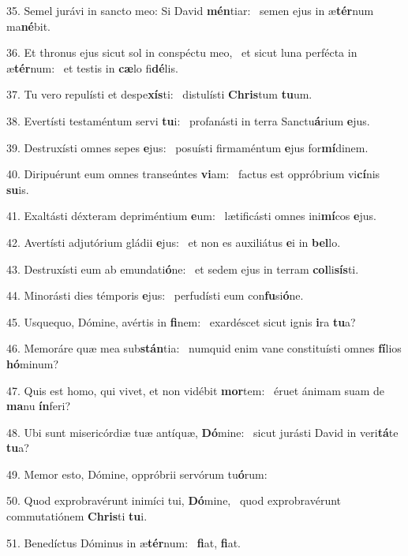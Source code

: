35. Semel jurávi in sancto meo: Si David \textbf{mén}tiar: \ast\  semen ejus in æ\textbf{tér}num ma\textbf{né}bit.\

36. Et thronus ejus sicut sol in conspéctu meo, \dag\  et sicut luna perfécta in æ\textbf{tér}num: \ast\  et testis in \textbf{cæ}lo fi\textbf{dé}lis.\

37. Tu vero repulísti et despe\textbf{xís}ti: \ast\  distulísti \textbf{Chris}tum \textbf{tu}um.\

38. Evertísti testaméntum servi \textbf{tu}i: \ast\  profanásti in terra Sanctu\textbf{á}rium \textbf{e}jus.\

39. Destruxísti omnes sepes \textbf{e}jus: \ast\  posuísti firmaméntum \textbf{e}jus for\textbf{mí}dinem.\

40. Diripuérunt eum omnes transeúntes \textbf{vi}am: \ast\  factus est oppróbrium vi\textbf{cí}nis \textbf{su}is.\

41. Exaltásti déxteram depriméntium \textbf{e}um: \ast\  lætificásti omnes ini\textbf{mí}cos \textbf{e}jus.\

42. Avertísti adjutórium gládii \textbf{e}jus: \ast\  et non es auxiliátus \textbf{e}i in \textbf{bel}lo.\

43. Destruxísti eum ab emundati\textbf{ó}ne: \ast\  et sedem ejus in terram \textbf{col}li\textbf{sís}ti.\

44. Minorásti dies témporis \textbf{e}jus: \ast\  perfudísti eum con\textbf{fu}si\textbf{ó}ne.\

45. Usquequo, Dómine, avértis in \textbf{fi}nem: \ast\  exardéscet sicut ignis \textbf{i}ra \textbf{tu}a?\

46. Memoráre quæ mea sub\textbf{stán}tia: \ast\  numquid enim vane constituísti omnes \textbf{fí}lios \textbf{hó}minum?\

47. Quis est homo, qui vivet, et non vidébit \textbf{mor}tem: \ast\  éruet ánimam suam de \textbf{ma}nu \textbf{ín}feri?\

48. Ubi sunt misericórdiæ tuæ antíquæ, \textbf{Dó}mine: \ast\  sicut jurásti David in veri\textbf{tá}te \textbf{tu}a?\

49. Memor esto, Dómine, oppróbrii servórum tu\textbf{ó}rum: \ast\  \

50. Quod exprobravérunt inimíci tui, \textbf{Dó}mine, \ast\  quod exprobravérunt commutatiónem \textbf{Chris}ti \textbf{tu}i.\

51. Benedíctus Dóminus in æ\textbf{tér}num: \ast\  \textbf{fi}at, \textbf{fi}at.\

